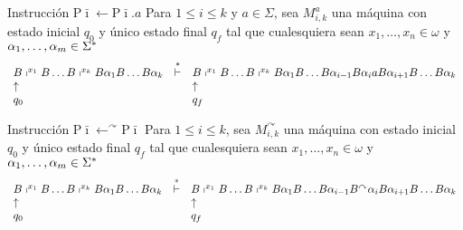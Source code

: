 \begin{frame}
	\begin{block}{Instrucción $\mathrm{P}\bar{\imath} \leftarrow \mathrm{P}\bar{\imath}.a$}
		\PN Para $1 \leq i \leq k$ y $a \in \Sigma $, sea $M_{i,k}^{a}$ una máquina con estado inicial $q_{0}$ y único
		estado final $q_{f}$ tal que cualesquiera sean $x_{1}, \dotsc, x_{n} \in \omega$ y $\alpha_{1}, \dotsc,\alpha_{m}
		\in \Sigma^{\ast}$
		\minLetter
		\[
			\begin{array}{lcl}
				B \shortmid^{x_{1}} B \dotsc B \shortmid^{x_{k}} B \alpha_{1} B \dotsc B \alpha_{k} &\overset{\ast}{\vdash}& B
					\shortmid^{x_{1}} B \dotsc B \shortmid^{x_{k}} B \alpha_{1} B \dotsc B \alpha_{i-1} B \alpha_{i} a B
					\alpha_{i+1} B \dotsc B \alpha_{k} \\
				\uparrow && \uparrow \\
				q_{0} && q_{f}
			\end{array}
		\]
	\end{block}

  \begin{block}{Instrucción $\mathrm{P}\bar{\imath} \leftarrow ^{\curvearrowright}\mathrm{P}\bar{\imath}$}
		\PN Para $1 \leq i \leq k$, sea $M_{i,k}^{\curvearrowright}$ una máquina con estado inicial $q_{0}$ y único estado
		final $q_{f}$ tal que cualesquiera sean $x_{1}, \dotsc, x_{n} \in \omega$ y $\alpha_{1}, \dotsc,\alpha_{m} \in
		\Sigma^{\ast}$
    \minLetter
    \[
      \begin{array}{lcl}
        B \shortmid^{x_{1}} B \dotsc B \shortmid^{x_{k}} B \alpha_{1} B \dotsc B \alpha_{k} &\overset{\ast}{\vdash}& B
          \shortmid^{x_{1}} B \dotsc B \shortmid^{x_{k}} B \alpha_{1} B \dotsc B \alpha_{i-1} B^{\curvearrowright}
          \alpha_{i} B \alpha_{i+1} B \dotsc B \alpha_{k} \\
        \uparrow && \uparrow \\
        q_{0} && q_{f}
      \end{array}
    \]
  \end{block}
\end{frame}
